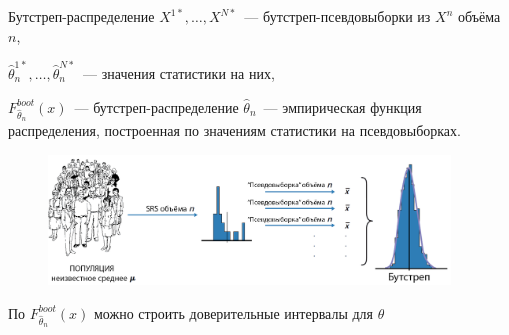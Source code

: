 \documentclass[11pt,pdf,utf8,hyperref={unicode},aspectratio=169]{beamer}
\begin{document}
\begin{frame}{Бутстреп-распределение}
	$X^{1*}, \dots, X^{N*}$~--- бутстреп-псевдовыборки из $X^n$ объёма $n$,

	$\hat{\theta}_n^{1*}, \dots, \hat{\theta}_n^{N*}$~--- значения статистики на них,

	$F_{\hat{\theta}_n}^{boot}(x)$~--- бутстреп-распределение $\hat{\theta}_n$~--- эмпирическая функция распределения, построенная по значениям статистики на псевдовыборках.

	\bigskip

	\begin{figure}
		\includegraphics[width=0.95\textwidth]{boot3.png}
	\end{figure}

	\bigskip

	По $F_{\hat{\theta}_n}^{boot}(x)$ можно строить доверительные интервалы для $\theta$
\end{frame}
\end{document}
